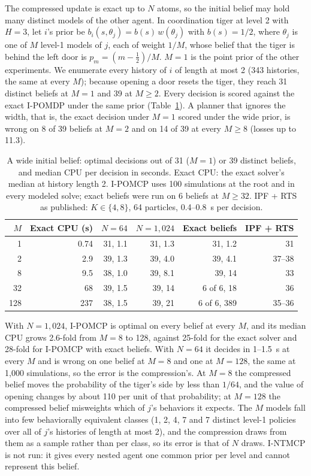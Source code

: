 \documentclass{article}
\begin{document}
The compressed update is exact up to $N$ atoms, so the initial belief may hold many distinct models of the other agent. In coordination tiger at level 2 with $H = 3$, let $i$'s prior be $b_i(s, \theta_j) = b(s)\, w(\theta_j)$ with $b(s) = 1/2$, where $\theta_j$ is one of $M$ level-1 models of $j$, each of weight $1/M$, whose belief that the tiger is behind the left door is $p_m = (m - \frac{1}{2})/M$. $M = 1$ is the point prior of the other experiments. We enumerate every history of $i$ of length at most 2 (343 histories, the same at every $M$); because opening a door resets the tiger, they reach 31 distinct beliefs at $M = 1$ and 39 at $M \geq 2$. Every decision is scored against the exact I-POMDP under the same prior (Table~\ref{tab:wide}). A planner that ignores the width, that is, the exact decision under $M = 1$ scored under the wide prior, is wrong on 8 of 39 beliefs at $M = 2$ and on 14 of 39 at every $M \geq 8$ (losses up to 11.3).

\begin{table}[h]
\centering
\footnotesize
\setlength{\tabcolsep}{3pt}
\begin{tabular}{@{}rrrrrr@{}}
\toprule
$M$ & Exact CPU (s) & $N = 64$ & $N = 1{,}024$ & Exact beliefs & IPF + RTS \\
\midrule
1 & 0.74 & 31, 1.1 & 31, 1.3 & 31, 1.2 & 31 \\
2 & 2.9 & 39, 1.3 & 39, 4.0 & 39, 4.1 & 37--38 \\
8 & 9.5 & 38, 1.0 & 39, 8.1 & 39, 14 & 33 \\
32 & 68 & 39, 1.5 & 39, 14 & 6 of 6, 18 & 36 \\
128 & 237 & 38, 1.5 & 39, 21 & 6 of 6, 389 & 35--36 \\
\bottomrule
\end{tabular}
\caption{A wide initial belief: optimal decisions out of 31 ($M = 1$) or 39 distinct beliefs, and median CPU per decision in seconds. Exact CPU: the exact solver's median at history length 2. I-POMCP uses 100 simulations at the root and in every modeled solve; exact beliefs were run on 6 beliefs at $M \geq 32$. IPF + RTS as published: $K \in \{4, 8\}$, 64 particles, 0.4--0.8~s per decision.}
\label{tab:wide}
\end{table}

With $N = 1{,}024$, I-POMCP is optimal on every belief at every $M$, and its median CPU grows 2.6-fold from $M = 8$ to 128, against 25-fold for the exact solver and 28-fold for I-POMCP with exact beliefs. With $N = 64$ it decides in 1--1.5~s at every $M$ and is wrong on one belief at $M = 8$ and one at $M = 128$, the same at 1{,}000 simulations, so the error is the compression's. At $M = 8$ the compressed belief moves the probability of the tiger's side by less than $1/64$, and the value of opening changes by about 110 per unit of that probability; at $M = 128$ the compressed belief misweights which of $j$'s behaviors it expects. The $M$ models fall into few behaviorally equivalent classes (1, 2, 4, 7 and 7 distinct level-1 policies over all of $j$'s histories of length at most 2), and the compression draws from them as a sample rather than per class, so its error is that of $N$ draws. I-NTMCP is not run: it gives every nested agent one common prior per level and cannot represent this belief.
\end{document}
